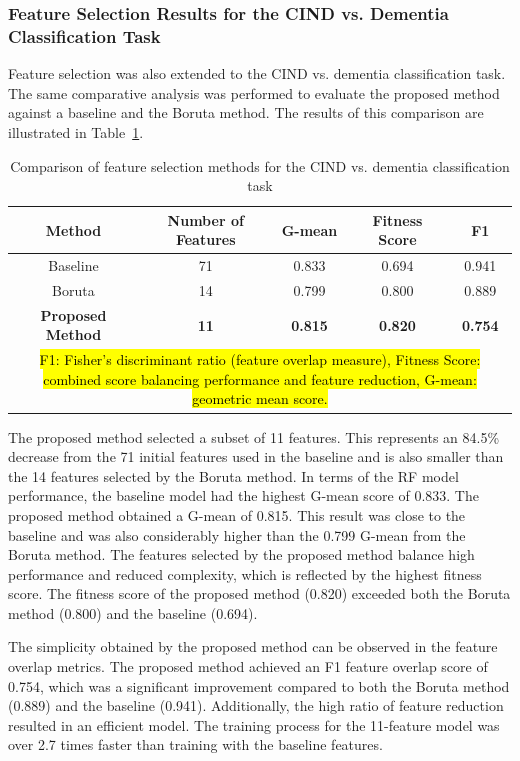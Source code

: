 \subsubsection{Feature Selection Results for the CIND vs. Dementia Classification Task}
Feature selection was also extended to the CIND vs. dementia classification task. The same comparative analysis was performed to evaluate the proposed method against a baseline and the Boruta method. The results of this comparison are illustrated in Table~\ref{table:fs-task2}.

\begin{table}[!ht]
    \centering
    \caption{Comparison of feature selection methods for the CIND vs. dementia classification task}
    \begin{tabular}{|c|c|c|c|c|}
    \hline
        Method & Number of Features & G-mean & Fitness Score & F1 \\ \hline
        Baseline & 71 & 0.833 & 0.694 & 0.941 \\ \hline
        Boruta & 14 & 0.799 & 0.800 & 0.889 \\ \hline
        \textbf{Proposed Method} & \textbf{11} & \textbf{0.815} & \textbf{0.820} & \textbf{0.754} \\ \hline
        \multicolumn{5}{p{400pt}}{\footnotesize \hl{F1: Fisher's discriminant ratio (feature overlap measure), Fitness Score: combined score balancing performance and feature reduction, G-mean: geometric mean score.}}
    \end{tabular}
    \label{table:fs-task2}
\end{table}

The proposed method selected a subset of 11 features. This represents an 84.5\% decrease from the 71 initial features used in the baseline and is also smaller than the 14 features selected by the Boruta method. In terms of the RF model performance, the baseline model had the highest G-mean score of 0.833. The proposed method obtained a G-mean of 0.815. This result was close to the baseline and was also considerably higher than the 0.799 G-mean from the Boruta method. The features selected by the proposed method balance high performance and reduced complexity, which is reflected by the highest fitness score. The fitness score of the proposed method (0.820) exceeded both the Boruta method (0.800) and the baseline (0.694).

The simplicity obtained by the proposed method can be observed in the feature overlap metrics. The proposed method achieved an F1 feature overlap score of 0.754, which was a significant improvement compared to both the Boruta method (0.889) and the baseline (0.941). Additionally, the high ratio of feature reduction resulted in an efficient model. The training process for the 11-feature model was over 2.7 times faster than training with the baseline features.

